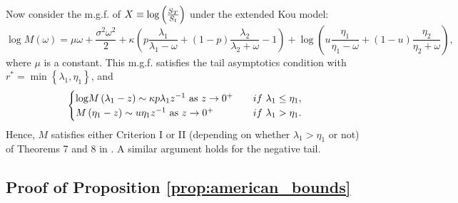 \documentclass[11pt]{article}
\numberwithin{equation}{section}
\numberwithin{theorem}{section}
\begin{document}
Now consider the m.g.f. of $X\equiv\hbox{log}\left(\frac{S_T}{S_t}\right)$ under the extended Kou model:
\[
{\log}M\left(\omega\right)=\mu\omega+\frac{\sigma^{2}\omega^{2}}{2}+\kappa\left(p\frac{\lambda_{1}}{\lambda_{1}-\omega}+\left(1-p\right)\frac{\lambda_{2}}{\lambda_{2}+\omega}-1\right)+{\log}\left(u\frac{\eta_{1}}{\eta_{1}-\omega}+\left(1-u\right)\frac{\eta_{2}}{\eta_{2}+\omega}\right),
\]
where $\mu$ is a constant. This m.g.f.   satisfies the tail asymptotics condition with  $r^{*}=\min\left\{ \lambda_{1},\eta_{1}\right\}$, and 
\[
\begin{cases}
{\log}M\left(\lambda_{1}-z\right)\sim\kappa p\lambda_{1}z^{-1}\mbox{ as \ensuremath{z\rightarrow0^{+}}} & \quad if\ \lambda_{1}\leq\eta_{1},\\
M\left(\eta_{1}-z\right)\sim u\eta_{1}z^{-1}\mbox{ as \ensuremath{z\rightarrow0^{+}}} & \quad if\ \lambda_{1}>\eta_{1}. 
\end{cases}
\]
Hence,  $M$ satisfies either Criterion I or II (depending on  whether $\lambda_1>\eta_1$ or not) of    
Theorems 7 and 8 in  \citet{Benaim2008}. A similar argument holds for the negative tail.

\subsection{Proof of Proposition \ref{prop:american_bounds}}
\end{document}
